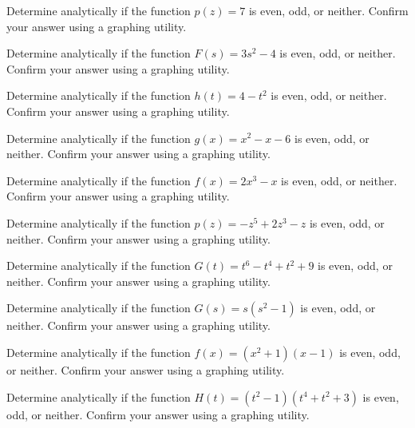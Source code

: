 \documentclass{ximera}
\begin{document}
\begin{problem}
Determine analytically if the function $p(z) = 7$ is even, odd, or neither.  Confirm your answer using a graphing utility.  
\end{problem}

\begin{problem}
Determine analytically if the function $F(s) = 3s^2 - 4$ is even, odd, or neither.  Confirm your answer using a graphing utility.  
\end{problem}

\begin{problem}
Determine analytically if the function $h(t) = 4-t^2$ is even, odd, or neither.  Confirm your answer using a graphing utility.  
\end{problem} 

\begin{problem}
Determine analytically if the function $g(x) = x^2-x-6$ is even, odd, or neither.  Confirm your answer using a graphing utility.  
\end{problem} 

\begin{problem}
Determine analytically if the function $f(x) = 2x^3 - x$ is even, odd, or neither.  Confirm your answer using a graphing utility.  
\end{problem} 

\begin{problem}
Determine analytically if the function $p(z) = -z^5 + 2z^3 - z$ is even, odd, or neither.  Confirm your answer using a graphing utility.  
\end{problem} 

\begin{problem}
Determine analytically if the function $G(t) = t^{6} - t^{4} + t^{2} + 9$ is even, odd, or neither.  Confirm your answer using a graphing utility.  
\end{problem} 
 
\begin{problem}
Determine analytically if the function $G(s) = s(s^2 - 1)$ is even, odd, or neither.  Confirm your answer using a graphing utility.  
\end{problem} 

\begin{problem}
Determine analytically if the function $f(x) = (x^2+1)(x-1)$ is even, odd, or neither.  Confirm your answer using a graphing utility.  
\end{problem}

\begin{problem}
Determine analytically if the function $H(t) = (t^2-1)(t^4+t^2+3)$ is even, odd, or neither.  Confirm your answer using a graphing utility.  
\end{problem}
\end{document}
